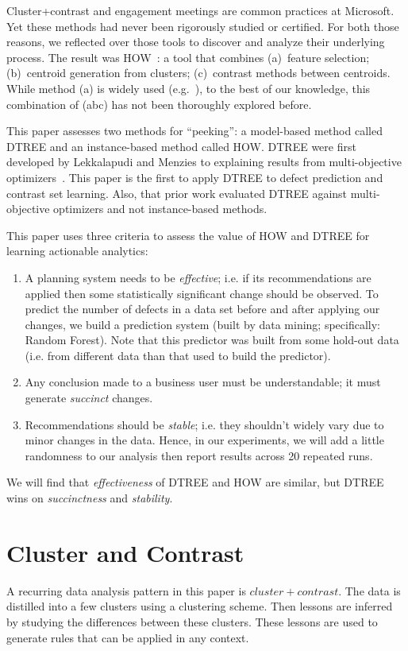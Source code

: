 \documentclass{sig-alternate}
\newcommand{\be}{\begin{enumerate}}
\newcommand{\ee}{\end{enumerate}}
\begin{document}
	
	Cluster+contrast and engagement
	meetings are common practices at Microsoft. Yet  these methods had never been rigorously studied or certified.
	For both those reasons,
	we reflected over those tools to discover and analyze their
	underlying process. The result was HOW~\cite{howase}: a tool
	that combines (a)~feature selection; (b)~centroid generation from   clusters;
	(c)~contrast methods between centroids.
	While method (a) is widely used (e.g.~\cite{Menzies2010}),
	to the best of our knowledge, this combination of (abc) has not been thoroughly explored before.

This paper assesses two methods  for ``peeking'': a model-based method called DTREE and an instance-based method   called HOW. 
DTREE were first developed by Lekkalapudi and Menzies to  explaining results from multi-objective optimizers~\cite{nva14}. This paper is the first
to apply DTREE to defect prediction and contrast set learning. Also, that prior work evaluated
DTREE against multi-objective optimizers and not   instance-based methods.

This paper uses three criteria to assess the value of HOW and DTREE for
learning actionable analytics:
\be
\item
A planning system needs to be {\em effective}; i.e. if its recommendations
are applied then some statistically significant change should be observed.
To predict the number of defects in a data set before and after applying our changes,
we build a    prediction system (built by data mining; specifically: Random Forest). Note that this
predictor was built from some hold-out data (i.e. from  different data than that used
to build the predictor).
\item
Any  conclusion made to a business user must be understandable;
it must generate {\em succinct} changes.  
\item
Recommendations should be {\em stable}; i.e. they shouldn't widely vary due to minor changes in the data. Hence, in our experiments, we will add a little randomness to our analysis then report results across 20 repeated runs. 
\ee
We will find that
 {\em effectiveness} of DTREE and HOW are similar, but   DTREE wins on {\em succinctness} and {\em stability}.

\section{Cluster and Contrast}
\label{clust_contrast}
A recurring data analysis pattern in this paper is $cluster+contrast$. The data is distilled into a few clusters using a clustering scheme. Then lessons are inferred by studying the differences between these clusters. These lessons are used to generate rules that can be applied in any context.
\end{document}
